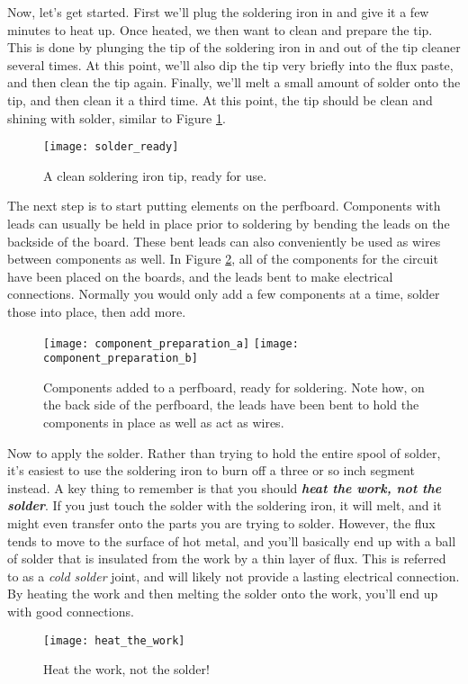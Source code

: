 Now, let's get started. First we'll plug the soldering iron in and give it a 
few minutes to heat up. Once heated, we then want to clean and prepare the tip.
This is done by plunging the tip of the soldering iron in and out of the tip 
cleaner several times. At this point, we'll also dip the tip very briefly 
into the flux paste, and then clean the tip again. Finally, we'll melt a small 
amount of solder onto the tip, and then clean it a third time. At this point,
the tip should be clean and shining with solder, similar to Figure
\ref{fig:solder_ready}.
\begin{figure}[hbp!]
\centering
\texttt{[image: solder\_ready]}
\caption[A clean soldering iron tip]{A clean soldering iron tip, ready for
use.}
\label{fig:solder_ready}
\end{figure}

The next step is to start putting elements on the perfboard. Components with
leads can usually be held in place prior to soldering by bending the leads on
the backside of the board. These bent leads can also conveniently be used as
wires between components as well. In Figure \ref{fig:component_preparation},
all of the components for the circuit have been placed on the boards, and 
the leads bent to make electrical connections. Normally you would only add a 
few components at a time, solder those into place, then add more.
\begin{figure}[hbp!]
\centering
\texttt{[image: component\_preparation\_a]}
\texttt{[image: component\_preparation\_b]}
\caption[Components added to a perfboard, ready for soldering]{Components added
to a perfboard, ready for soldering. Note how, on the back side of the 
perfboard, the leads have been bent to hold the components in place as well as
act as wires.}
\label{fig:component_preparation}
\end{figure}

Now to apply the solder. Rather than trying to hold the entire spool of 
solder, it's easiest to use the soldering iron to burn off a three or so inch
segment instead. A key thing to remember is that you should
\textit{\textbf{heat the work, not the solder}}. If you just touch the solder
with the soldering iron, it will melt, and it might even transfer onto the
parts you are trying to solder. However, the flux tends to move to the 
surface of hot metal, and you'll basically end up with a ball of solder that
is insulated from the work by a thin layer of flux. This is referred to as a
\textit{cold solder} joint, and will likely not provide a lasting electrical
connection. By heating the work and then melting the solder onto the work,
you'll end up with good connections. 
\begin{figure}[hbp!]
\centering
\texttt{[image: heat\_the\_work]}
\caption[Heat the work, not the solder!]{Heat the work, not the solder!}
\label{fig:heat_the_work}
\end{figure}

